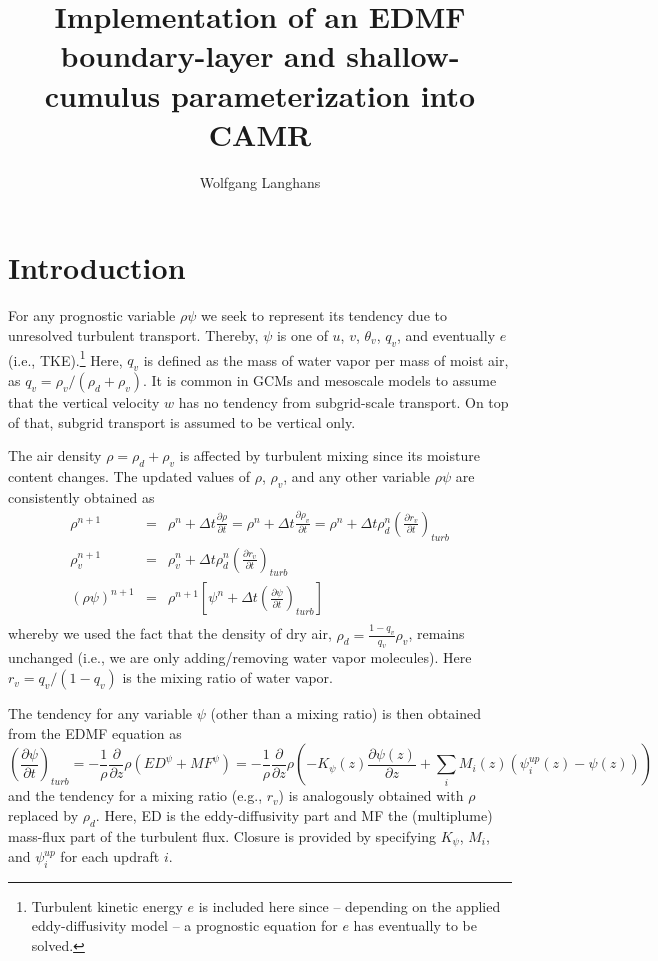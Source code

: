 \documentclass[dvipdfmx,a4paper,10pt]{article}
\title{Implementation of an EDMF boundary-layer and shallow-cumulus parameterization into CAMR}
\author{Wolfgang Langhans}
\begin{document}
\maketitle

\section{Introduction}\label{se:intro}

For any prognostic variable $\rho\psi$ we seek to represent its tendency due to unresolved turbulent transport. Thereby, $\psi$ is one of $u$, $v$, $\theta_v$, $q_v$, and eventually $e$ (i.e., TKE).\footnote{Turbulent kinetic energy $e$ is included here since -- depending on the applied eddy-diffusivity model -- a prognostic equation for $e$ has eventually to be solved.} Here, $q_v$ is defined as the mass of water vapor per mass of moist air, as $q_v=\rho_v/(\rho_d+\rho_v)$. It is common in GCMs and mesoscale models to assume that the vertical velocity $w$ has no tendency from subgrid-scale transport. On top of that, subgrid transport is assumed to be vertical only. 

The air density $\rho=\rho_d+\rho_v$ is affected by turbulent mixing since its moisture content changes. The updated values of $\rho$, $\rho_v$, and any other variable $\rho \psi$ are consistently obtained as 
\begin{eqnarray}
\rho^{n+1}&=&\rho^n + \Delta t \frac{\partial \rho}{\partial t}=\rho^n + \Delta t \frac{\partial \rho_v}{\partial t}=\rho^n + \Delta t \rho_d^n\left(\frac{\partial r_v}{\partial t}\right)_{turb} \\
\rho_v^{n+1}&=&\rho_v^n + \Delta t \rho_d^n\left(\frac{\partial r_v}{\partial t}\right)_{turb}\\
 (\rho\psi)^{n+1} &=& \rho^{n+1}\left[\psi^n + \Delta t \left(\frac{\partial \psi}{\partial t}\right)_{turb}\right]\\
\end{eqnarray}
whereby we used the fact that the density of dry air, $\rho_d=\frac{1-q_v}{q_v}\rho_v$, remains unchanged (i.e., we are only adding/removing water vapor molecules). Here $r_v=q_v/(1-q_v)$ is the mixing ratio of water vapor.  

The tendency for any variable $\psi$ (other than a mixing ratio) is then obtained from the EDMF equation as
\begin{equation}\label{eqn:tendency}
 \left(\frac{\partial \psi}{\partial t}\right)_{turb} =-\frac{1}{\rho}\frac{\partial }{\partial z} \rho \left( ED^{\psi} + MF^{\psi}\right) = -\frac{1}{\rho}\frac{\partial }{\partial z} \rho\left( -K_{\psi}(z)\frac{\partial \psi(z)}{\partial z} + \sum_i M_i(z) (\psi^{up}_i(z) - \psi(z) )\right)
\end{equation}
and the tendency for a mixing ratio (e.g., $r_v$) is analogously obtained with $\rho$ replaced by $\rho_d$. Here, ED is the eddy-diffusivity part and MF the (multiplume) mass-flux part of the turbulent flux. Closure is provided by specifying $K_{\psi}$, $M_i$, and $\psi^{up}_i$ for each updraft $i$.
\end{document}
